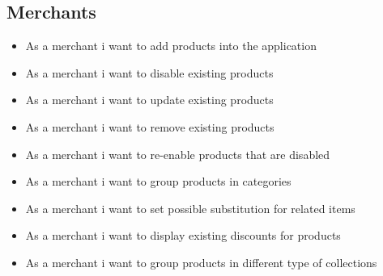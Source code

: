 \subsection{Merchants}
\begin{itemize}
    \item As a merchant i want to add products into the application
    \item As a merchant i want to disable existing products
    \item As a merchant i want to update existing products
    \item As a merchant i want to remove existing products
    \item As a merchant i want to re-enable products that are disabled
    \item As a merchant i want to group products in categories
    \item As a merchant i want to set possible substitution for related items
    \item As a merchant i want to display existing discounts for products
    \item As a merchant i want to group products in different type of 
    collections
\end{itemize}
